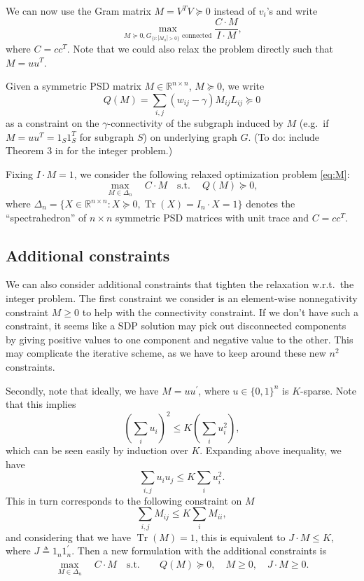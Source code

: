 \documentclass{article}
\DeclareMathOperator{\Tr}{Tr}
\begin{document}
We can now use the Gram matrix $M = V^T V \succeq 0$ instead of $v_i$'s and write
\begin{equation}\label{eq:M}
  \max_{M \succeq 0, G_{\{i: |M_{ii}| > 0\}} \text{ connected}} \frac{C \cdot M}{I \cdot M},
\end{equation}
where $C = c c^T$. Note that we could also relax the problem directly such that $M = u u^T$.

Given a symmetric PSD matrix $M \in \mathbb{R}^{n \times n}$, $M \succeq 0$, we write
\[ Q(M) = \sum_{i,j} (w_{ij} - \gamma) M_{ij} L_{ij} \succeq 0 \]
as a constraint on the $\gamma$-connectivity of the subgraph induced by $M$ (e.g.\ if $M = u u^T = 1_S 1_S^T$ for subgraph $S$) on underlying graph $G$. (To do: include Theorem 3 in \cite{nips} for the integer problem.)

Fixing $I \cdot M = 1$, we consider the following relaxed optimization problem \eqref{eq:M}:
\begin{equation}\label{eq:opt}
  \max_{M \in \Delta_n} \quad C \cdot M \quad \mathrm{s.t.\ } \quad Q(M) \succeq 0,
\end{equation}
where $\Delta_n = \{X \in \mathbb{R}^{n \times n} : X \succeq 0, \Tr(X) = I_n \cdot X = 1 \}$ denotes the ``spectrahedron'' of $n \times n$ symmetric PSD matrices with unit trace and $C = c c^T$.



\subsection{Additional constraints}

We can also consider additional constraints that tighten the relaxation w.r.t.\ the integer problem. The first constraint we consider is an element-wise nonnegativity constraint $M \geq 0$ to help with the connectivity constraint. If we don't have such a constraint, it seems like a SDP solution may pick out disconnected components by giving positive values to one component and negative value to the other. This may complicate the iterative scheme, as we have to keep around these new $n^2$ constraints.

Secondly, note that ideally, we have $M = u u^\prime$, where $u \in \{0,1\}^n$ is $K$-sparse. Note that this implies
\[ \left( \sum_i u_i \right)^2 \leq K \left( \sum_i u_i^2 \right), \]
which can be seen easily by induction over $K$. Expanding above inequality, we have
\[ \sum_{i,j} u_i u_j \leq K \sum_i u_i^2. \]
This in turn corresponds to the following constraint on $M$
\[ \sum_{i,j} M_{ij} \leq K \sum_i M_{ii}, \]
and considering that we have $\Tr(M) = 1$, this is equivalent to $J \cdot M \leq K$, where $J \triangleq 1_n 1_n^\prime$. Then a new formulation with the additional constraints is
\begin{align}\label{eq:opt_add}
  \max_{M \in \Delta_n} \quad C \cdot M \quad \mathrm{s.t.\ } \quad & Q(M) \succeq 0, \quad M \geq 0, \quad J \cdot M \geq 0.
\end{align}
\end{document}
